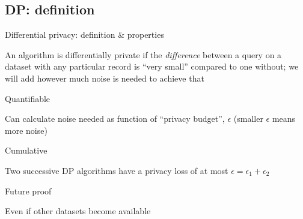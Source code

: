 \documentclass[xor=table]{beamer}
\def\itemsymbol{\textbullet}
\let\svpar\par
\let\svitemize\itemize
\let\svenditemize\enditemize
\let\svitem\item
\let\svcenter\center
\let\svendcenter\endcenter
\let\svcolumn\column
\let\svendcolumn\endcolumn
\def\newitem{\renewcommand\item[1][\itemsymbol]{\vfill\svitem[##1]}}%
\def\newpar{\def\par{\svpar\vfill}}%
\newcommand\stretchon{%
  \newpar%
  \renewcommand\item[1][\itemsymbol]{\svitem[##1]\newitem}%
  \renewenvironment{itemize}%
    {\svitemize}{\svenditemize\newpar\par}%
  \renewenvironment{center}%
    {\svcenter\newpar}{\svendcenter\newpar}%
  \renewenvironment{column}[2]%
    {\svcolumn{##1}\setlength{\parskip}{\columnskip}##2}%
    {\svendcolumn\vspace{\columnskip}}%
}
\begin{document}
\subsection*{DP: definition}
\stretchon
\begin{frame}{Differential privacy: definition \& properties}
\begin{multicols}{2}
\begin{itemize}


\item An algorithm is differentially private if the \textit{difference} between a query on a dataset with any particular record is ``very small'' compared to one without; we will add however much noise is needed to achieve that


\end{itemize}

\columnbreak

\begin{itemize}
\item Quantifiable
\begin{itemize}
\item Can calculate noise needed as function of ``privacy budget'', $\epsilon$ (smaller $\epsilon$ means more noise)
\end{itemize}

\item Cumulative
\begin{itemize}
\item Two successive DP algorithms have a privacy loss of at most $\epsilon = \epsilon_1 + \epsilon_2$

\end{itemize}

\item Future proof

\begin{itemize}
\item Even if other datasets become available
\end{itemize}
\end{itemize}

\end{multicols}
\end{frame}



\end{document}
